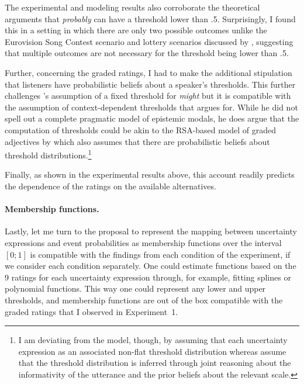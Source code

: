 The experimental and modeling results also corroborate the theoretical arguments that \textit{probably} can have a threshold lower than .5. Surprisingly,
I found this in a setting in which there are only two possible outcomes unlike the Eurovision Song Contest scenario and lottery scenarios discussed by \cite{Lassiter2017, Yacin2010, Teigen1988},
suggesting that multiple outcomes are not necessary for the threshold being lower than .5.

Further, concerning the graded ratings, I had to make the additional stipulation that listeners have probabilistic beliefs about a speaker's thresholds. 
This further challenges \cite{Yalcin2010}'s assumption of a fixed threshold for \textit{might} but it is compatible with the assumption of context-dependent
thresholds that \cite{Lassiter2017} argues for. While he did not spell out a complete pragmatic model of epistemic modals, he does argue that the computation 
of thresholds could be akin to the RSA-based model of graded adjectives by \cite{LassiterGoodman} which also assumes that there are probabilistic beliefs about
threshold distributions.\footnote{I am deviating from the \cite{LassiterGoodman2015} model, though, by assuming that each uncertainty expression  as an 
associated non-flat threshold distribution whereas \cite{LassiterGoodman2015} assume that the threshold distribution is inferred through joint reasoning about the informativity of the utterance and the prior beliefs about the relevant scale.}

Finally, as shown in the experimental results above, this account readily predicts the dependence of the ratings on the available alternatives.

\paragraph{Membership functions.} Lastly, let me turn to the proposal to represent the mapping between uncertainty expressions and event probabilities
as membership functions over the interval $[0;1]$ is compatible with the findings from each condition of the experiment, 
if we consider each condition separately.  One could estimate functions  based on the 9 ratings for each uncertainty expression through, 
for example, fitting splines or polynomial functions. This way one could represent any lower and upper thresholds, and membership functions 
are out of the box compatible with the graded ratings that I observed in Experiment~1.

